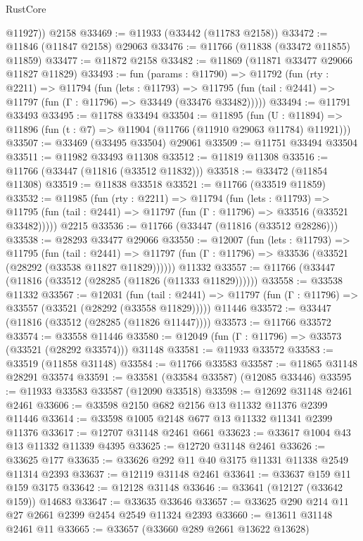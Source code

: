 \begin{lexlean}{RustCore}
\begin{coremodule}
        @11927))
    @2158
@33469 := @11933 (@33442 (@11783 @2158))
@33472 := @11846 (@11847 @2158) @29063
@33476 := @11766 (@11838 (@33472 @11855) @11859)
@33477 := @11872 @2158
@33482 := @11869 (@11871 @33477 @29066 @11827 @11829)
@33493 := fun (params : @11790) =>
  @11792
    (fun (rty : @2211) =>
    @11794
      (fun (lets : @11793) =>
      @11795 (fun (tail : @2441) => @11797 (fun (Γ : @11796) => @33449 (@33476 @33482)))))
@33494 := @11791 @33493
@33495 := @11788 @33494
@33504 := @11895
    (fun (U : @11894) => @11896 (fun (t : @7) => @11904 (@11766 (@11910 @29063 @11784) @11921)))
@33507 := @33469 (@33495 @33504) @29061
@33509 := @11751 @33494 @33504
@33511 := @11982 @33493 @11308
@33512 := @11819 @11308
@33516 := @11766 (@33447 (@11816 (@33512 @11832)))
@33518 := @33472 (@11854 @11308)
@33519 := @11838 @33518
@33521 := @11766 (@33519 @11859)
@33532 := @11985
    (fun (rty : @2211) =>
    @11794
      (fun (lets : @11793) =>
      @11795 (fun (tail : @2441) => @11797 (fun (Γ : @11796) => @33516 (@33521 @33482)))))
    @2215
@33536 := @11766 (@33447 (@11816 (@33512 @28286)))
@33538 := @28293 @33477 @29066
@33550 := @12007
    (fun (lets : @11793) =>
    @11795
      (fun (tail : @2441) =>
      @11797 (fun (Γ : @11796) => @33536 (@33521 (@28292 (@33538 @11827 @11829))))))
    @11332
@33557 := @11766 (@33447 (@11816 (@33512 (@28285 (@11826 (@11333 @11829))))))
@33558 := @33538 @11332
@33567 := @12031
    (fun (tail : @2441) => @11797 (fun (Γ : @11796) => @33557 (@33521 (@28292 (@33558 @11829)))))
    @11446
@33572 := @33447 (@11816 (@33512 (@28285 (@11826 @11447))))
@33573 := @11766 @33572
@33574 := @33558 @11446
@33580 := @12049 (fun (Γ : @11796) => @33573 (@33521 (@28292 @33574))) @31148
@33581 := @11933 @33572
@33583 := @33519 (@11858 @31148)
@33584 := @11766 @33583
@33587 := @11865 @31148 @28291 @33574
@33591 := @33581 (@33584 @33587) (@12085 @33446)
@33595 := @11933 @33583 @33587 (@12090 @33518)
@33598 := @12692 @31148 @2461 @2461
@33606 := @33598 @2150 @682 @2156 @13 @11332 @11376 @2399 @11446
@33614 := @33598 @1005 @2148 @677 @13 @11332 @11341 @2399 @11376
@33617 := @12707 @31148 @2461 @661
@33623 := @33617 @1004 @43 @13 @11332 @11339 @4395
@33625 := @12720 @31148 @2461
@33626 := @33625 @177
@33635 := @33626 @292 @11 @40 @3175 @11331 @11338 @2549 @11314 @2393
@33637 := @12119 @31148 @2461
@33641 := @33637 @159 @11 @159 @3175
@33642 := @12128 @31148
@33646 := @33641 (@12127 (@33642 @159)) @14683
@33647 := @33635 @33646
@33657 := @33625 @290 @214 @11 @27 @2661 @2399 @2454 @2549 @11324 @2393
@33660 := @13611 @31148 @2461 @11
@33665 := @33657 (@33660 @289 @2661 @13622 @13628)

\end{coremodule}
\end{lexlean}
